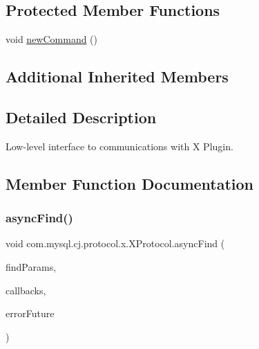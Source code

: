 \subsection*{Protected Member Functions}
\begin{DoxyCompactItemize}
\item 
void \mbox{\hyperlink{classcom_1_1mysql_1_1cj_1_1protocol_1_1x_1_1_x_protocol_a76e7478617951a6d654ce106da83c15e}{new\+Command}} ()
\end{DoxyCompactItemize}
\subsection*{Additional Inherited Members}


\subsection{Detailed Description}
Low-\/level interface to communications with X Plugin. 

\subsection{Member Function Documentation}
\mbox{\label{classcom_1_1mysql_1_1cj_1_1protocol_1_1x_1_1_x_protocol_a2880204cc61b5a581f7add54e8d8a268}} 
\subsubsection{\texorpdfstring{async\+Find()}{asyncFind()}}
{\footnotesize\ttfamily void com.\+mysql.\+cj.\+protocol.\+x.\+X\+Protocol.\+async\+Find (\begin{DoxyParamCaption}\item[{\mbox{\hyperlink{interfacecom_1_1mysql_1_1cj_1_1xdevapi_1_1_find_params}{Find\+Params}}}]{find\+Params,  }\item[{\mbox{\hyperlink{interfacecom_1_1mysql_1_1cj_1_1protocol_1_1_result_listener}{Result\+Listener}}$<$ \mbox{\hyperlink{classcom_1_1mysql_1_1cj_1_1protocol_1_1x_1_1_statement_execute_ok}{Statement\+Execute\+Ok}} $>$}]{callbacks,  }\item[{Completable\+Future$<$?$>$}]{error\+Future }\end{DoxyParamCaption})}


